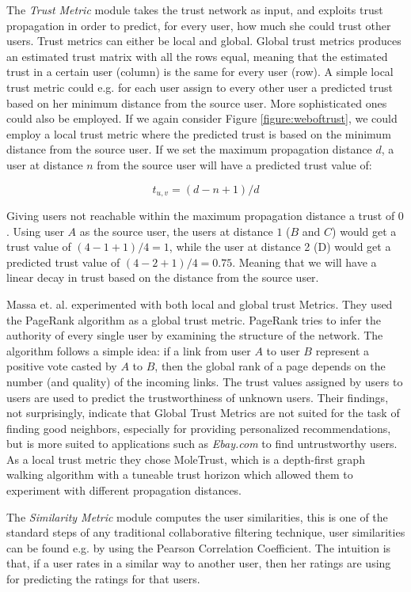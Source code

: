The \emph{Trust Metric} module takes the trust network as input, and exploits
trust propagation in order to predict, for every user, how much she could trust
other users. Trust metrics can either be local and global. Global trust metrics
produces an estimated trust matrix with all the rows equal, meaning that the
estimated trust in a certain user (column) is the same for every user (row). A
simple local trust metric could e.g. for each user assign to every other user a
predicted trust based on her minimum distance from the source user. More
sophisticated ones could also be employed. If we again consider Figure
\ref{figure:weboftrust}, we could employ a local trust metric where the
predicted trust is based on the minimum distance from the source user. If we
set the maximum propagation distance $d$, a user at distance $n$ from the
source user will have a predicted trust value of:

\begin{equation}
t_{u,v} = (d-n+1)/d
\end{equation}

Giving users not reachable within the maximum propagation distance a trust of
$0$. Using user $A$ as the source user, the users at distance $1$ ($B$ and $C$)
would get a trust value of $(4-1+1)/4 = 1$, while the user at distance 2 (D)
would get a predicted trust value of $(4-2+1)/4 = 0.75$. Meaning that we will
have a linear decay in trust based on the distance from the source user.

Massa et. al. \cite{Massa2007} experimented with both local and global trust
Metrics. They used the PageRank algorithm as a global trust metric. PageRank
tries to infer the authority of every single user by examining the structure of
the network. The algorithm follows a simple idea: if a link from user $A$ to user
$B$ represent a positive vote casted by $A$ to $B$, then the global rank of a page
depends on the number (and quality) of the incoming links. The trust values
assigned by users to users are used to predict the trustworthiness of unknown
users. Their findings, not surprisingly, indicate that Global Trust Metrics are
not suited for the task of finding good neighbors, especially for providing
personalized recommendations, but is more suited to applications such as \emph{Ebay.com} to find untrustworthy users. As a local trust metric they chose MoleTrust, which is a depth-first graph walking algorithm with a tuneable trust horizon
which allowed them to experiment with different propagation distances.

The \emph{Similarity Metric} module computes the user similarities, this is one
of the standard steps of any traditional collaborative filtering technique,
user similarities can be found e.g. by using the Pearson Correlation
Coefficient. The intuition is that, if a user rates in a similar way to another
user, then her ratings are using for predicting the ratings for that users.

